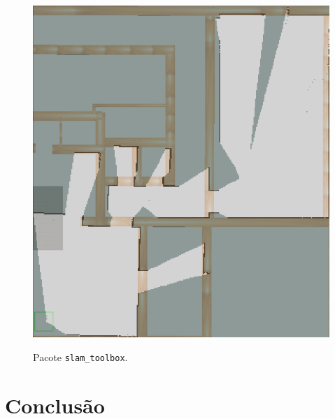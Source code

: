 \documentclass[repeatfields,xlists,xpacks,oneside,yearsonly]{ufrgscca}
\begin{document}
\begin{figure}[h]
    {
        \centering
        \caption{Pacote \texttt{slam\_toolbox}.}
        \label{fig:mapping_slam_toolbox}
        \includegraphics[width=0.6\linewidth]{slam_toolbox_map-compared.png}\\
    }
\end{figure}



\chapter{Conclusão}
\label{conclusao}


\printbibliography

%
%
%
\end{document}

